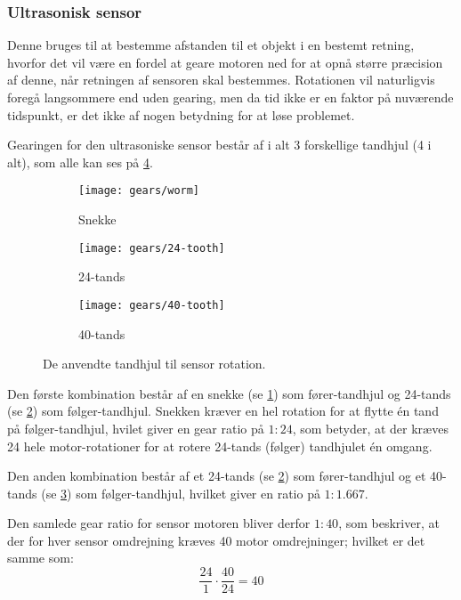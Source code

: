 \subsubsection{Ultrasonisk sensor}
Denne bruges til at bestemme afstanden til et objekt i en bestemt retning, hvorfor det vil være en fordel at geare motoren ned for at opnå større præcision af denne, når retningen af sensoren skal bestemmes.
Rotationen vil naturligvis foregå langsommere end uden gearing, men da tid ikke er en faktor på nuværende tidspunkt, er det ikke af nogen betydning for at løse problemet.

Gearingen for den ultrasoniske sensor består af i alt 3 forskellige tandhjul (4 i alt), som alle kan ses på \cref{gearing:tandhjul}.

\begin{figure}[h] %
\centering
\begin{subfigure}[b]{.19\textwidth}
\centering
\texttt{[image: gears/worm]}
\caption{Snekke}
\label{gearing:snekke}
\end{subfigure}
\begin{subfigure}[b]{.19\textwidth}
\centering
\texttt{[image: gears/24-tooth]}
\caption{24-tands}
\label{gearing:24tand}
\end{subfigure}
\begin{subfigure}[b]{.19\textwidth}
\centering
\texttt{[image: gears/40-tooth]}
\caption{40-tands}
\label{gearing:40tand}
\end{subfigure}
\caption{De anvendte tandhjul til sensor rotation.}
\label{gearing:tandhjul}
\end{figure}

Den første kombination består af en snekke\cite{snekke} (se \cref{gearing:snekke}) som fører-tandhjul og 24-tands (se \cref{gearing:24tand}) som følger-tandhjul.
Snekken kræver en hel rotation for at flytte én tand på følger-tandhjul, hvilet giver en gear ratio på $1:24$, som betyder, at der kræves 24 hele motor-rotationer for at rotere 24-tands (følger) tandhjulet én omgang.

Den anden kombination består af et 24-tands (se \cref{gearing:24tand}) som fører-tandhjul og et 40-tands (se \cref{gearing:40tand}) som følger-tandhjul, hvilket giver en ratio på $1:1.667$.

Den samlede gear ratio for sensor motoren bliver derfor $1:40$, som beskriver, at der for hver sensor omdrejning kræves 40 motor omdrejninger; hvilket er det samme som:
$$\frac{24}{1} \cdot \frac{40}{24} = 40$$